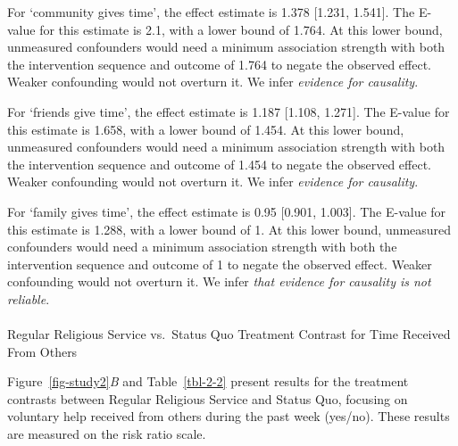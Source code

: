 \documentclass[
  single column]{article}
\makeatletter
\let\oldparagraph\paragraph
\renewcommand{\paragraph}{
    \@ifstar
      \xxxParagraphStar
      \xxxParagraphNoStar
  }
\newcommand{\xxxParagraphStar}[1]{\oldparagraph*{#1}\mbox{}}
\newcommand{\xxxParagraphNoStar}[1]{\oldparagraph{#1}\mbox{}}
\makeatother
\begin{document}
For `community gives time', the effect estimate is 1.378 {[}1.231,
1.541{]}. The E-value for this estimate is 2.1, with a lower bound of
1.764. At this lower bound, unmeasured confounders would need a minimum
association strength with both the intervention sequence and outcome of
1.764 to negate the observed effect. Weaker confounding would not
overturn it. We infer \emph{evidence for causality}.

For `friends give time', the effect estimate is 1.187 {[}1.108,
1.271{]}. The E-value for this estimate is 1.658, with a lower bound of
1.454. At this lower bound, unmeasured confounders would need a minimum
association strength with both the intervention sequence and outcome of
1.454 to negate the observed effect. Weaker confounding would not
overturn it. We infer \emph{evidence for causality}.

For `family gives time', the effect estimate is 0.95 {[}0.901, 1.003{]}.
The E-value for this estimate is 1.288, with a lower bound of 1. At this
lower bound, unmeasured confounders would need a minimum association
strength with both the intervention sequence and outcome of 1 to negate
the observed effect. Weaker confounding would not overturn it. We infer
\emph{that evidence for causality is not reliable}.

\paragraph{Regular Religious Service vs.~Status Quo Treatment Contrast
for Time Received From
Others}\label{regular-religious-service-vs.-status-quo-treatment-contrast-for-time-received-from-others}

Figure~\ref{fig-study2}\emph{B} and Table~\ref{tbl-2-2} present results
for the treatment contrasts between Regular Religious Service and Status
Quo, focusing on voluntary help received from others during the past
week (yes/no). These results are measured on the risk ratio scale.
\end{document}
